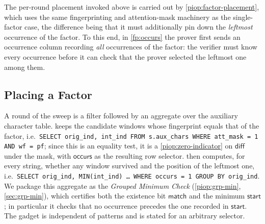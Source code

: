 The per-round placement invoked above is carried out by \cref{piop:factor-placement}, which uses the same fingerprinting and attention-mask machinery as the single-factor case, the difference being that it must additionally pin down the \emph{leftmost} occurrence of the factor. To this end, in \cref{fp:occurs} the prover first sends an occurrence column recording \emph{all} occurrences of the factor: the verifier must know every occurrence before it can check that the prover selected the leftmost one among them.

\subsection{Placing a Factor}
\label{sec:factor-placement}

 A round of the sweep is a filter followed by an aggregate over the auxiliary character table.  keeps the candidate windows whose fingerprint equals that of the factor, i.e.\ \texttt{SELECT orig\_ind, int\_ind FROM s.aux\_chars WHERE att\_mask = 1 AND wf = pf}; since this is an equality test, it is a \cref{piop:zero-indicator} on $\mathsf{diff}$ under the mask, with $\mathsf{occurs}$ as the resulting row selector.  then computes, for every string, whether any window survived and the position of the leftmost one, i.e.\ \texttt{SELECT orig\_ind, MIN(int\_ind) \dots\ WHERE occurs = 1 GROUP BY orig\_ind}. We package this aggregate as the \emph{Grouped Minimum Check} (\cref{piop:grp-min}, \cref{sec:grp-min}), which certifies both the existence bit $\mathsf{match}$ and the minimum $\mathsf{start}$; in particular it checks that no occurrence precedes the one recorded in $\mathsf{start}$. The gadget is independent of patterns and is stated for an arbitrary selector.

